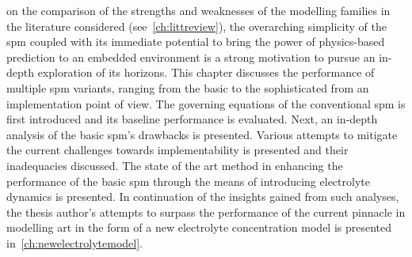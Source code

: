 




 on the  comparison of the strengths and  weaknesses of the
modelling families in the  literature considered (see~\cref{ch:littreview}), the
overarching simplicity of the \gls{spm}  coupled with its immediate potential to
bring the  power of  physics-based prediction  to an  embedded environment  is a
strong  motivation to  pursue  an  in-depth exploration  of  its horizons.  This
chapter discusses the  performance of multiple \gls{spm}  variants, ranging from
the  basic to  the  sophisticated  from an  implementation  point  of view.  The
governing  equations  of the  conventional  \gls{spm}  is first  introduced  and
its  baseline  performance is  evaluated.  Next,  an  in-depth analysis  of  the
basic  \gls{spm}'s drawbacks  is  presented. Various  attempts  to mitigate  the
current challenges towards implementability  is presented and their inadequacies
discussed. The state of the art method in enhancing the performance of the basic
\gls{spm} through the means of introducing electrolyte dynamics is presented. In
continuation  of the  insights gained  from such  analyses, the  thesis author's
attempts  to  surpass the  performance  of  the  current pinnacle  in  modelling
art  in  the  form  of  a  new  electrolyte  concentration  model  is  presented
in~\cref{ch:newelectrolytemodel}.










